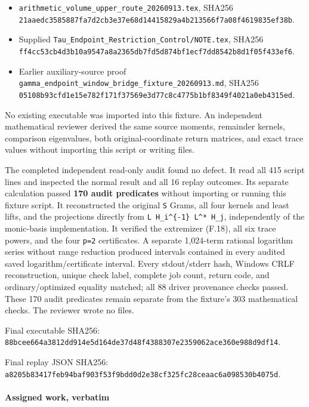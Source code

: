 \begin{itemize}
\tightlist
\item
  \texttt{arithmetic\_volume\_upper\_route\_20260913.tex}, SHA256 \texttt{21aaedc3585887fa7d2cb3e37e68d14415829a4b213566f7a08f4619835ef38b}.
\item
  Supplied \texttt{Tau\_Endpoint\_Restriction\_Control/NOTE.tex}, SHA256 \texttt{ff4cc53cb4d3b10a9547a8a2365db7fd5d874bf1ecf7dd8542b8d1f05f433ef6}.
\item
  Earlier auxiliary-source proof \texttt{gamma\_endpoint\_window\_bridge\_fixture\_20260913.md}, SHA256 \texttt{05108b93cfd1e15e782f171f37569e3d77c8c4775b1bf8349f4021a0eb4315ed}.
\end{itemize}

No existing executable was imported into this fixture. An independent mathematical reviewer derived the same source moments, remainder kernels, comparison eigenvalues, both original-coordinate return matrices, and exact trace values without importing this script or writing files.

The completed independent read-only audit found no defect. It read all 415 script lines and inspected the normal result and all 16 replay outcomes. Its separate calculation passed \textbf{170 audit predicates} without importing or running this fixture script. It reconstructed the original \texttt{S} Grams, all four kernels and least lifts, and the projections directly from \texttt{L\ H\_i\^{}\{-1\}\ L\^{}*\ H\_j}, independently of the monic-basis implementation. It verified the extremizer (F.18), all six trace powers, and the four \texttt{p=2} certificates. A separate 1,024-term rational logarithm series without range reduction produced intervals contained in every audited saved logarithm/certificate interval. Every stdout/stderr hash, Windows CRLF reconstruction, unique check label, complete job count, return code, and ordinary/optimized equality matched; all 88 driver provenance checks passed. These 170 audit predicates remain separate from the fixture's 303 mathematical checks. The reviewer wrote no files.

Final executable SHA256: \texttt{88bcee664a3812dd914e5d164de37d48f4388307e2359062ace360e988d9df14}.

Final replay JSON SHA256: \texttt{a8205b83417feb94baf903f53f9bdd0d2e38cf325fc28ceaac6a098530b4075d}.

\paragraph{Assigned work, verbatim}\label{endpoint-restriction_fixture--assigned-work-verbatim}

